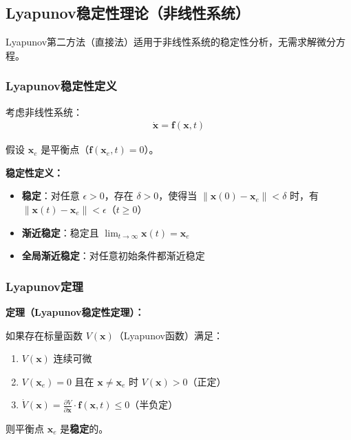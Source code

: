 \subsection{Lyapunov稳定性理论（非线性系统）}

Lyapunov第二方法（直接法）适用于非线性系统的稳定性分析，无需求解微分方程。

\subsubsection{Lyapunov稳定性定义}

考虑非线性系统：
\begin{align*}
\dot{\mathbf{x}} = \mathbf{f}(\mathbf{x}, t)
\end{align*}

假设 $\mathbf{x}_e$ 是平衡点（$\mathbf{f}(\mathbf{x}_e, t) = 0$）。

\textbf{稳定性定义：}

\begin{itemize}
    \item \textbf{稳定}：对任意 $\epsilon > 0$，存在 $\delta > 0$，使得当 $\|\mathbf{x}(0) - \mathbf{x}_e\| < \delta$ 时，有 $\|\mathbf{x}(t) - \mathbf{x}_e\| < \epsilon$（$t \geq 0$）
    \item \textbf{渐近稳定}：稳定且 $\lim_{t\to\infty} \mathbf{x}(t) = \mathbf{x}_e$
    \item \textbf{全局渐近稳定}：对任意初始条件都渐近稳定
\end{itemize}

\subsubsection{Lyapunov定理}

\textbf{定理（Lyapunov稳定性定理）：}

如果存在标量函数 $V(\mathbf{x})$（Lyapunov函数）满足：

\begin{enumerate}
    \item $V(\mathbf{x})$ 连续可微
    \item $V(\mathbf{x}_e) = 0$ 且在 $\mathbf{x} \neq \mathbf{x}_e$ 时 $V(\mathbf{x}) > 0$（正定）
    \item $\dot{V}(\mathbf{x}) = \frac{\partial V}{\partial \mathbf{x}} \cdot \mathbf{f}(\mathbf{x}, t) \leq 0$（半负定）
\end{enumerate}

则平衡点 $\mathbf{x}_e$ 是\textbf{稳定}的。

